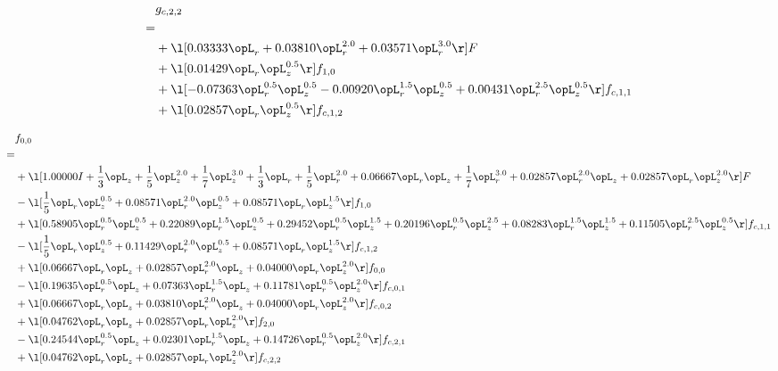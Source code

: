 \begin{alignat}{2} 
\label{eq:g_22_0} 
& g_{c,2,2} \nonumber \\ 
 = \\ 
& + \l[  0.03333 \opL_r +  0.03810 \opL_r^{2.0} +  0.03571 \opL_r^{3.0}  \r] F \nonumber \\ 
& + \l[  0.01429 \opL_r \opL_z^{0.5}  \r] f_{1,0} \nonumber \\ 
& + \l[  -0.07363 \opL_r^{0.5} \opL_z^{0.5}   -0.00920 \opL_r^{1.5} \opL_z^{0.5} +  0.00431 \opL_r^{2.5} \opL_z^{0.5}  \r] f_{c,1,1} \nonumber \\ 
& + \l[  0.02857 \opL_r \opL_z^{0.5}  \r] f_{c,1,2} \nonumber \\ 
\end{alignat} 


\begin{alignat}{2} 
\label{eq:f_00_1} 
& f_{0,0} \nonumber \\ 
 = \\ 
& + \l[  1.00000 I + \frac{1}{3} \opL_z + \frac{1}{5} \opL_z^{2.0} + \frac{1}{7} \opL_z^{3.0} + \frac{1}{3} \opL_r + \frac{1}{5} \opL_r^{2.0} +  0.06667 \opL_r \opL_z + \frac{1}{7} \opL_r^{3.0} +  0.02857 \opL_r^{2.0} \opL_z +  0.02857 \opL_r \opL_z^{2.0}  \r] F \nonumber \\ 
& - \l[ \frac{1}{5} \opL_r \opL_z^{0.5} +  0.08571 \opL_r^{2.0} \opL_z^{0.5} +  0.08571 \opL_r \opL_z^{1.5}  \r] f_{1,0} \nonumber \\ 
& + \l[  0.58905 \opL_r^{0.5} \opL_z^{0.5} +  0.22089 \opL_r^{1.5} \opL_z^{0.5} +  0.29452 \opL_r^{0.5} \opL_z^{1.5} +  0.20196 \opL_r^{0.5} \opL_z^{2.5} +  0.08283 \opL_r^{1.5} \opL_z^{1.5} +  0.11505 \opL_r^{2.5} \opL_z^{0.5}  \r] f_{c,1,1} \nonumber \\ 
& - \l[ \frac{1}{5} \opL_r \opL_z^{0.5} +  0.11429 \opL_r^{2.0} \opL_z^{0.5} +  0.08571 \opL_r \opL_z^{1.5}  \r] f_{c,1,2} \nonumber \\ 
& + \l[  0.06667 \opL_r \opL_z +  0.02857 \opL_r^{2.0} \opL_z +  0.04000 \opL_r \opL_z^{2.0}  \r] f_{0,0} \nonumber \\ 
& - \l[  0.19635 \opL_r^{0.5} \opL_z +  0.07363 \opL_r^{1.5} \opL_z +  0.11781 \opL_r^{0.5} \opL_z^{2.0}  \r] f_{c,0,1} \nonumber \\ 
& + \l[  0.06667 \opL_r \opL_z +  0.03810 \opL_r^{2.0} \opL_z +  0.04000 \opL_r \opL_z^{2.0}  \r] f_{c,0,2} \nonumber \\ 
& + \l[  0.04762 \opL_r \opL_z +  0.02857 \opL_r \opL_z^{2.0}  \r] f_{2,0} \nonumber \\ 
& - \l[  0.24544 \opL_r^{0.5} \opL_z +  0.02301 \opL_r^{1.5} \opL_z +  0.14726 \opL_r^{0.5} \opL_z^{2.0}  \r] f_{c,2,1} \nonumber \\ 
& + \l[  0.04762 \opL_r \opL_z +  0.02857 \opL_r \opL_z^{2.0}  \r] f_{c,2,2} \nonumber \\ 
\end{alignat} 


